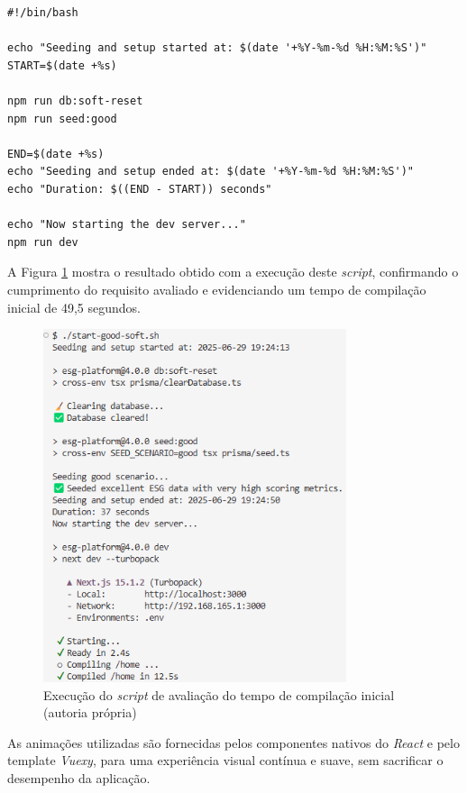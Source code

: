 \begin{lstlisting}[style=customts, caption={\textit{Script} de avaliação de performance da iniciação da aplicação desenvolvida}, label={lst:eval_script}]
#!/bin/bash

echo "Seeding and setup started at: $(date '+%Y-%m-%d %H:%M:%S')"
START=$(date +%s)

npm run db:soft-reset
npm run seed:good

END=$(date +%s)
echo "Seeding and setup ended at: $(date '+%Y-%m-%d %H:%M:%S')"
echo "Duration: $((END - START)) seconds"

echo "Now starting the dev server..."
npm run dev
\end{lstlisting}

A Figura \ref{fig:initial_compile} mostra o resultado obtido com a execução deste \textit{script}, confirmando o cumprimento do requisito avaliado e evidenciando um tempo de compilação inicial de 49,5 segundos.

\begin{figure}[H]
    \centering
    \includegraphics[width=3.5in,keepaspectratio]{frontmatter/assets/compiling/initial_compile.png}
    \caption{Execução do \textit{script} de avaliação do tempo de compilação inicial (autoria própria)}
    \label{fig:initial_compile}
\end{figure}

As animações utilizadas são fornecidas pelos componentes nativos do \textit{React} e pelo template \textit{Vuexy}, para uma experiência visual contínua e suave, sem sacrificar o desempenho da aplicação.

